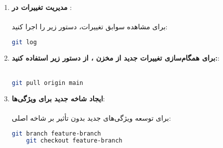 \begin{enumerate}
     \item \textbf{مدیریت تغییرات در }:\\\\
     برای مشاهده سوابق تغییرات، دستور زیر را اجرا کنید:
     \begin{terminal}
    \begin{lstlisting}[language=bash]
    git log
    \end{lstlisting}
    \end{terminal} 

    \item \textbf{برای همگام‌سازی تغییرات جدید از مخزن ، از دستور زیر استفاده کنید:}:\\\\
    \begin{terminal}
    \begin{lstlisting}[language=bash]
    git pull origin main
    \end{lstlisting}
    \end{terminal} 

    \item \textbf{ایجاد شاخه جدید برای ویژگی‌ها}:\\\\
    برای توسعه ویژگی‌های جدید بدون تأثیر بر شاخه اصلی:
    \begin{terminal}
    \begin{lstlisting}[language=bash]
    git branch feature-branch
    git checkout feature-branch
    \end{lstlisting}
    \end{terminal} 
    
    
\end{enumerate}
